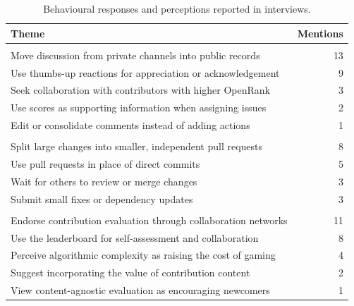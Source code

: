 \begin{table}[tbp]
\centering
\caption{Behavioural responses and perceptions reported in interviews.}\label{tab:ch6-themes}
\fontsize{9.5}{12}\selectfont
\renewcommand{\arraystretch}{1.13}
\begin{tabularx}{\textwidth}{@{}>{\raggedright\arraybackslash}Xr@{}}
\toprule
Theme & Mentions\\
\midrule
\multicolumn{2}{@{}l}{\textsf{Communication}}\\
Move discussion from private channels into public records & 13\\
Use thumbs-up reactions for appreciation or acknowledgement & 9\\
Seek collaboration with contributors with higher OpenRank & 3\\
Use scores as supporting information when assigning issues & 2\\
Edit or consolidate comments instead of adding actions & 1\\
\multicolumn{2}{@{}l}{\textsf{Development}}\\
Split large changes into smaller, independent pull requests & 8\\
Use pull requests in place of direct commits & 5\\
Wait for others to review or merge changes & 3\\
Submit small fixes or dependency updates & 3\\
\multicolumn{2}{@{}l}{\textsf{Perception}}\\
Endorse contribution evaluation through collaboration networks & 11\\
Use the leaderboard for self-assessment and collaboration & 8\\
Perceive algorithmic complexity as raising the cost of gaming & 4\\
Suggest incorporating the value of contribution content & 2\\
View content-agnostic evaluation as encouraging newcomers & 1\\
\bottomrule
\end{tabularx}
\end{table}

